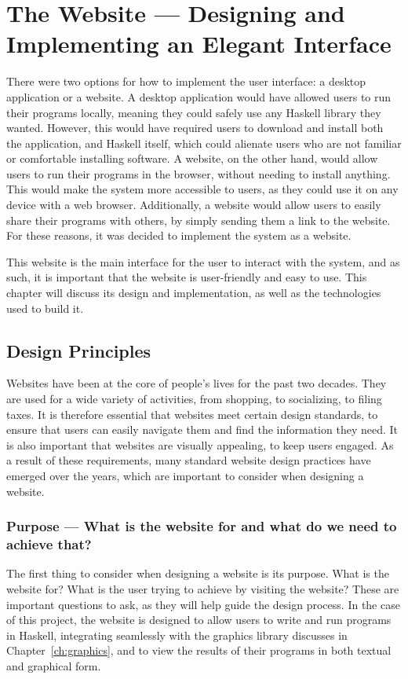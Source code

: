 \documentclass[../main.tex]{subfiles}
\begin{document}
\chapter{The Website — Designing and Implementing an Elegant Interface} \label{ch:website}
    There were two options for how to implement the user interface: a desktop
        application or a website.
    A desktop application would have allowed users to run their programs locally,
        meaning they could safely use any Haskell library they wanted.
    However, this would have required users to download and install both the
        application, and Haskell itself, which could alienate users who are not
        familiar or comfortable installing software.
    A website, on the other hand, would allow users to run their programs in the
        browser, without needing to install anything.
    This would make the system more accessible to users, as they could use it on
        any device with a web browser.
    Additionally, a website would allow users to easily share their programs with
        others, by simply sending them a link to the website.
    For these reasons, it was decided to implement the system as a website.

    This website is the main interface for the user to interact with the system,
        and as such, it is important that the website is user-friendly and easy to use.
    This chapter will discuss its design and implementation, as well as the
        technologies used to build it.

    \section{Design Principles}
        Websites have been at the core of people's lives for the past two decades.
        They are used for a wide variety of activities, from shopping, to socializing,
            to filing taxes.
        It is therefore essential that websites meet certain design standards, to
            ensure that users can easily navigate them and find the information they need.
        It is also important that websites are visually appealing, to keep users
            engaged.
        As a result of these requirements, many standard website design practices have
            emerged over the years, which are important to consider when designing a
            website.

        \subsection{Purpose — What is the website for and what do we need to achieve that?}
            The first thing to consider when designing a website is its purpose.
            What is the website for?
            What is the user trying to achieve by visiting the website?
            These are important questions to ask, as they will help guide the design
                process.
            In the case of this project, the website is designed to allow users to write
                and run programs in Haskell, integrating seamlessly with the graphics library
                discusses in Chapter~\ref{ch:graphics}, and to view the results of their
                programs in both textual and graphical form.
\end{document}
